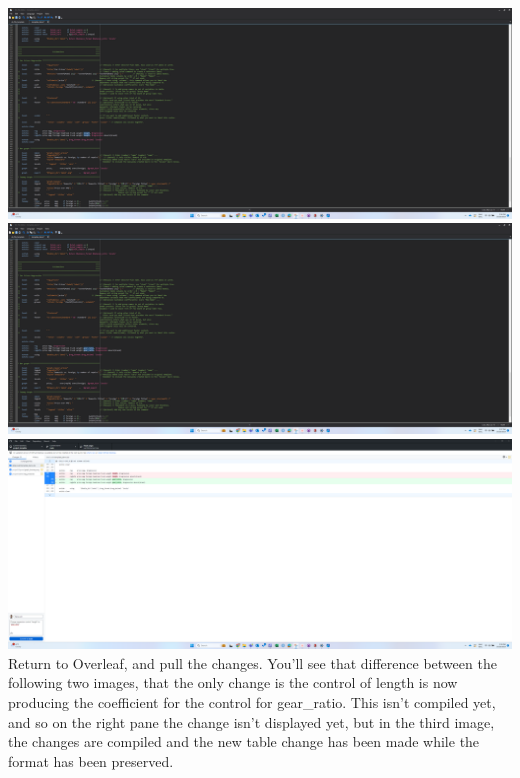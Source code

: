 \documentclass[12pt]{article}
\begin{document}
\includegraphics[width=1\textwidth]{Instructions/project_template_screenshots/project_template_21.png} \\

\includegraphics[width=1\textwidth]{Instructions/project_template_screenshots/project_template_22.png} \\

\includegraphics[width=1\textwidth]{Instructions/project_template_screenshots/project_template_23.png} \\

Return to Overleaf, and pull the changes. You'll see that difference between the following two images, that the only change is the control of length is now producing the coefficient for the control for gear\_ratio. This isn't compiled yet, and so on the right pane the change isn't displayed yet, but in the third image, the changes are compiled and the new table change has been made while the format has been preserved. \\
\end{document}
